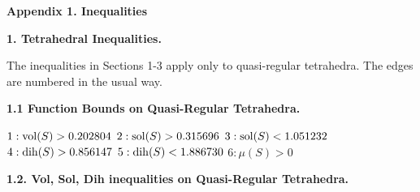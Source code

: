 \def\today{\ifcase\month\or
    January\or February\or March\or April\or May\or June\or
    July\or August\or September\or October\or November\or December\fi
    \space\number\day, \number\year}




\bigskip

\centerline{\bf Appendix 1. Inequalities}

\bigskip

{\bf 1. Tetrahedral Inequalities.}

\smallskip

The inequalities in Sections 1-3 apply only to quasi-regular tetrahedra.
The edges are numbered in the usual way.

\smallskip

{\bf 1.1 Function Bounds on Quasi-Regular Tetrahedra.}


$1:  \operatorname{vol}(S) > 0.202804$\newline
$2:  \operatorname{sol}(S) > 0.315696$\newline
$3:  \operatorname{sol}(S) < 1.051232$\newline
$4:  \operatorname{dih}(S) > 0.856147$\newline
$5:  \operatorname{dih}(S) < 1.886730$\newline
$6:  \mu(S) > 0$\newline


\smallskip

{\bf 1.2. Vol, Sol, Dih inequalities on Quasi-Regular Tetrahedra.}

\smallskip

